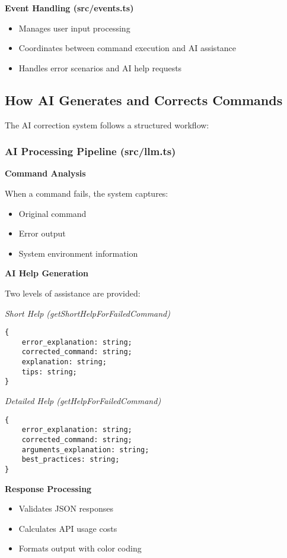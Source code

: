 \textbf{Event Handling (src/events.ts)}
\begin{itemize}
	\item Manages user input processing
	\item Coordinates between command execution and AI assistance
	\item Handles error scenarios and AI help requests
\end{itemize}

\subsection{How AI Generates and Corrects Commands}

The AI correction system follows a structured workflow:

\subsubsection{AI Processing Pipeline (src/llm.ts)}

\textbf{Command Analysis}

When a command fails, the system captures:
\begin{itemize}
	\item Original command
	\item Error output
	\item System environment information
\end{itemize}

\textbf{AI Help Generation}

Two levels of assistance are provided:

\textit{Short Help (getShortHelpForFailedCommand)}
\begin{verbatim}
{
    error_explanation: string;
    corrected_command: string;
    explanation: string;
    tips: string;
}
\end{verbatim}

\textit{Detailed Help (getHelpForFailedCommand)}
\begin{verbatim}
{
    error_explanation: string;
    corrected_command: string;
    arguments_explanation: string;
    best_practices: string;
}
\end{verbatim}

\textbf{Response Processing}
\begin{itemize}
	\item Validates JSON responses
	\item Calculates API usage costs
	\item Formats output with color coding
\end{itemize}

